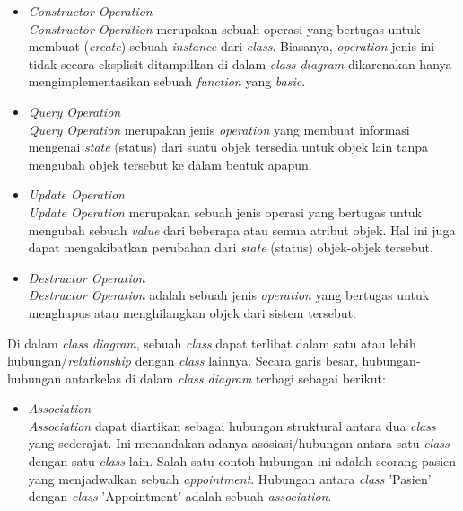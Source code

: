 \documentclass[a4paper]{article}
\begin{document}
\begin{enumerate}
\begin{itemize}
        \begin{itemize}
            \item \textit{Constructor Operation}\\
            \textit{Constructor Operation} merupakan sebuah operasi yang bertugas untuk membuat (\textit{create}) sebuah \textit{instance} dari \textit{class}. Biasanya, \textit{operation} jenis ini tidak secara eksplisit ditampilkan di dalam \textit{class diagram} dikarenakan hanya mengimplementasikan sebuah \textit{function} yang \textit{basic}\autocite{systemanalysisdesign-class-diagram}.
            \item \textit{Query Operation}\\
            \textit{Query Operation} merupakan jenis \textit{operation} yang membuat informasi mengenai \textit{state} (status) dari suatu objek tersedia untuk objek lain tanpa mengubah objek tersebut ke dalam bentuk apapun\autocite{systemanalysisdesign-class-diagram}.
            \item \textit{Update Operation}\\
            \textit{Update Operation} merupakan sebuah jenis operasi yang bertugas untuk mengubah sebuah \textit{value} dari beberapa atau semua atribut objek. Hal ini juga dapat mengakibatkan perubahan dari \textit{state} (status) objek-objek tersebut\autocite{systemanalysisdesign-class-diagram}.
            \item \textit{Destructor Operation}\\
            \textit{Destructor Operation} adalah sebuah jenis \textit{operation} yang bertugas untuk menghapus atau menghilangkan objek dari sistem tersebut\autocite{systemanalysisdesign-class-diagram}.
        \end{itemize}
    \end{itemize}
    Di dalam \textit{class diagram}, sebuah \textit{class} dapat terlibat dalam satu atau lebih hubungan/\textit{relationship} dengan \textit{class} lainnya. Secara garis besar, hubungan-hubungan antarkelas di dalam \textit{class diagram} terbagi sebagai berikut:
    \begin{itemize}
        \item \textit{Association}\\
        \textit{Association} dapat diartikan sebagai hubungan struktural antara dua \textit{class} yang sederajat\autocite{what-is-class-diagram}. Ini menandakan adanya asosiasi/hubungan antara satu \textit{class} dengan satu \textit{class} lain. Salah satu contoh hubungan ini adalah seorang pasien yang menjadwalkan sebuah \textit{appointment}. Hubungan antara \textit{class} 'Pasien' dengan \textit{class} 'Appointment' adalah sebuah \textit{association}\autocite{systemanalysisdesign-class-diagram-relations}.\\

\end{itemize}
\end{enumerate}
\end{document}
